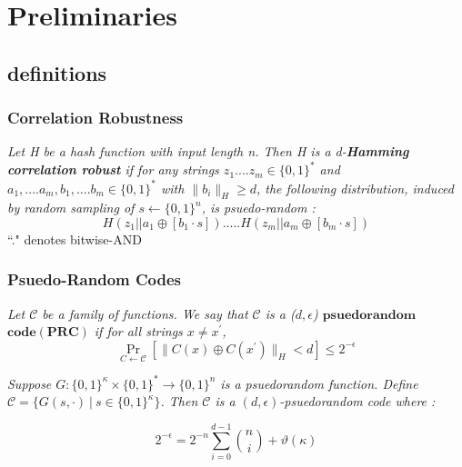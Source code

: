 \documentclass[hyperref={pdfpagelabels=false}]{beamer}
\theoremstyle{remark}
\begin{document}
\section{Preliminaries}
\subsection{definitions}
\begin{frame}
\frametitle{Correlation Robustness}

\begin{definition}[1]
\textit{Let H be a hash function with input length n. Then H is a d-\textbf{Hamming correlation robust} if for any strings $z_1....z_m \in \{0,1\}^*$ and $a_1,....a_m,b_1,....b_m \in \{0,1\}^*$ with $\|b_i\|_H \geq d $, the following distribution, induced by random sampling of $s \longleftarrow \{0,1\}^n$, is psuedo-random :}
\begin{equation*}
H(z_1||a_1 \oplus [b_1 \cdot s])..... H(z_m||a_m \oplus [b_m \cdot s])
\end{equation*}
``." denotes bitwise-AND
\end{definition}
\end{frame}

\begin{frame}
\frametitle{Psuedo-Random Codes}
\begin{definition}[2]
\textit{Let $\mathcal{C}$ be a family of functions. We say that $\mathcal{C}$ is a ($d,\epsilon$) $\mathbf{psuedorandom}$ $\mathbf{code(PRC)}$ if for all strings $x \neq x^\prime$,}
\begin{equation*}
\Pr_{C\leftarrow \mathcal{C}} \left[ \|C(x) \oplus C(x^\prime)\|_H < d \right] \leq 2^{-\epsilon}
\end{equation*}
\end{definition}\pause

\begin{lemma}[1]
\textit{Suppose $G : \{0,1\}^\kappa \times \{0,1\}^* \rightarrow \{0,1\}^n$ is a psuedorandom function. Define $\mathcal{C} = \{G(s,\cdot) \  | \ s \in \{0,1\}^\kappa\}$. Then $\mathcal{C}$ is a $(d,\epsilon)$-psuedorandom code where : }

\begin{equation*}
2^{-\epsilon} = 2^{-n}\sum_{i=0}^{d-1} {n \choose i} + \vartheta(\kappa)
\end{equation*}
\end{lemma}
\end{frame}
\end{document}
